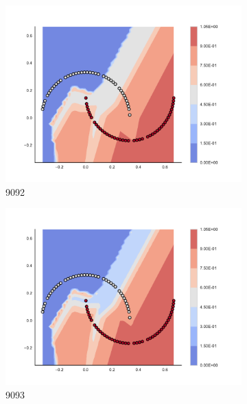 \begin{figure}[h]
\begin{subfigure}[b]{0.09\textwidth}
    \includegraphics[clip, trim=2.35cm 1.75cm 4.5cm 0cm,width=\textwidth]{img/convergence/9092.pdf}
    \caption{9092}
    \label{fig:convergence_9092}
\end{subfigure}
%
\begin{subfigure}[b]{0.09\textwidth}
    \includegraphics[clip, trim=2.35cm 1.75cm 4.5cm 0cm,width=\textwidth]{img/convergence/9093.pdf}
    \caption{9093}
    \label{fig:convergence_9093}
\end{subfigure}
%
\begin{subfigure}[b]{0.09\textwidth}

\end{subfigure}
\end{figure}
